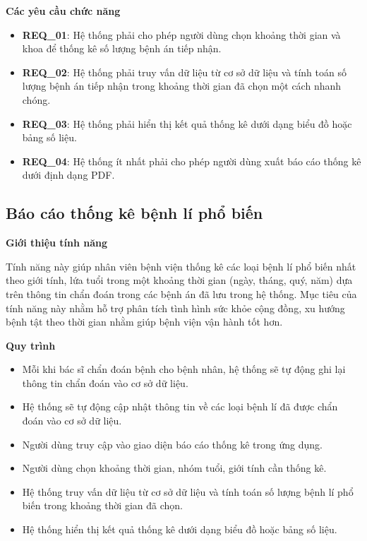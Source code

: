 \noindent \textbf{Các yêu cầu chức năng}

\begin{itemize}
    \item \textbf{REQ\_01}: Hệ thống phải cho phép người dùng chọn khoảng thời gian và khoa để thống kê số lượng bệnh án tiếp nhận.
    \item \textbf{REQ\_02}: Hệ thống phải truy vấn dữ liệu từ cơ sở dữ liệu và tính toán số lượng bệnh án tiếp nhận trong khoảng thời gian đã chọn một cách nhanh chóng.
    \item \textbf{REQ\_03}: Hệ thống phải hiển thị kết quả thống kê dưới dạng biểu đồ hoặc bảng số liệu.
    \item \textbf{REQ\_04}: Hệ thống ít nhất phải cho phép người dùng xuất báo cáo thống kê dưới định dạng PDF.     
\end{itemize}

\subsection{Báo cáo thống kê bệnh lí phổ biến}

\noindent \textbf{Giới thiệu tính năng}

Tính năng này giúp nhân viên bệnh viện thống kê các loại bệnh lí phổ biến nhất theo giới tính, lứa tuổi trong một khoảng thời gian (ngày, tháng, quý, năm) dựa trên thông tin chẩn đoán trong các bệnh án đã lưu trong hệ thống. Mục tiêu của tính năng này nhằm hỗ trợ phân tích tình hình sức khỏe cộng đồng, xu hướng bệnh tật theo thời gian nhằm giúp bệnh viện vận hành tốt hơn.

\noindent \textbf{Quy trình}

\begin{itemize}
    \item Mỗi khi bác sĩ chẩn đoán bệnh cho bệnh nhân, hệ thống sẽ tự động ghi lại thông tin chẩn đoán vào cơ sở dữ liệu.
    \item Hệ thống sẽ tự động cập nhật thông tin về các loại bệnh lí đã được chẩn đoán vào cơ sở dữ liệu.
    \item Người dùng truy cập vào giao diện báo cáo thống kê trong ứng dụng.
    \item Người dùng chọn khoảng thời gian, nhóm tuổi, giới tính cần thống kê.
    \item Hệ thống truy vấn dữ liệu từ cơ sở dữ liệu và tính toán số lượng bệnh lí phổ biến trong khoảng thời gian đã chọn.
    \item Hệ thống hiển thị kết quả thống kê dưới dạng biểu đồ hoặc bảng số liệu.
\end{itemize}

